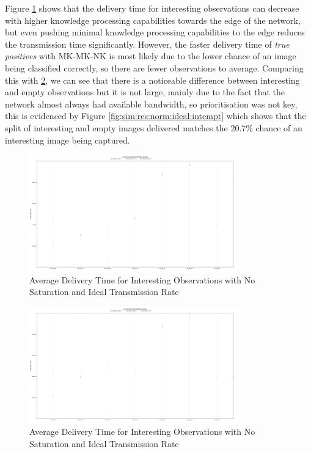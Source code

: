 	Figure \ref{fig:sim:res:norm:ideal:tpfp} shows that the delivery time for interesting observations can decrease with higher knowledge processing capabilities towards the edge of the network, but even pushing minimal knowledge processing capabilities to the edge reduces the transmission time significantly. However, the faster delivery time of \textit{true positives} with MK-MK-NK is most likely due to the lower chance of an image being classified correctly, so there are fewer observations to average. Comparing this with \ref{fig:sim:res:norm:ideal:tnfn}, we can see that there is a noticeable difference between interesting and empty observations but it is not large, mainly due to the fact that the network almost always had available bandwidth, so prioritisation was not key, this is evidenced by Figure \ref{fig:sim:res:norm:ideal:intempt} which shows that the split of interesting and empty images delivered matches the 20.7\% chance of an interesting image being captured.

	\begin{figure}[h]
	\centering
	\includegraphics[width=0.8\textwidth]{Chap7/figures/plots/normal_ideal/tpvsfp_delivered.png}
	\caption{Average Delivery Time for Interesting Observations with No Saturation and Ideal Transmission Rate}
	\label{fig:sim:res:norm:ideal:tpfp}
	\end{figure}

	\begin{figure}[h]
	\centering
	\includegraphics[width=0.8\textwidth]{Chap7/figures/plots/normal_ideal/tnvsfn_delivered.png}
	\caption{Average Delivery Time for Interesting Observations with No Saturation and Ideal Transmission Rate}
	\label{fig:sim:res:norm:ideal:tnfn}
	\end{figure}

